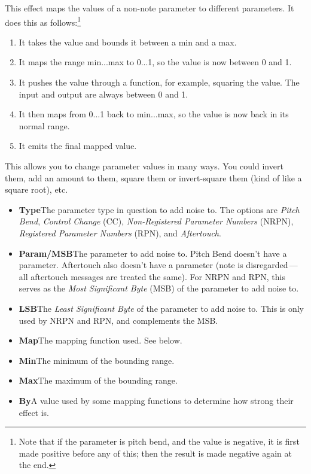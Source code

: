 \documentclass[twoside,10pt]{article}
\begin{document}
This effect maps the values of a non-note parameter to different parameters.  It does this as follows:\footnote{Note that if the parameter is pitch bend, and the value is negative, it is first made positive before any of this; then the result is made negative again at the end.}

\begin{enumerate}
\item It takes the value and bounds it between a min and a max.
\item It maps the range min...max to 0...1, so the value is now between 0 and 1.
\item It pushes the value through a function, for example, squaring the value.  The input and output are always between 0 and 1.
\item It then maps from 0...1 back to min...max, so the value is now back in its normal range.
\item It emits the final mapped value.
\end{enumerate}

This allows you to change parameter values in many ways. You could invert them, add an amount to them, square them or invert-square them (kind of like a square root), etc.

\begin{itemize}
\item {\bf Type}\qquad The parameter type in question to add noise to.  The options are {\it Pitch Bend}, {\it Control Change} (CC), {\it Non-Registered Parameter Numbers} (NRPN), {\it Registered Parameter Numbers} (RPN), and {\it Aftertouch}.
\item {\bf Param/MSB}\qquad The parameter to add noise to.  Pitch Bend doesn't have a parameter.  Aftertouch also doesn't have a parameter (note is disregarded\,---\,all aftertouch messages are treated the same).
  For NRPN and RPN, this serves as the {\it Most Significant Byte} (MSB) of the parameter to add noise to.
\item {\bf LSB}\qquad The {\it Least Significant Byte} of the parameter to add noise to.  This is only used by NRPN and RPN, and complements the MSB.
\item {\bf Map}\qquad The mapping function used.  See below.
\item {\bf Min}\qquad The minimum of the bounding range.
\item {\bf Max}\qquad The maximum of the bounding range.
\item {\bf By}\qquad A value used by some mapping functions to determine how strong their effect is.
\end{itemize}
\end{document}
